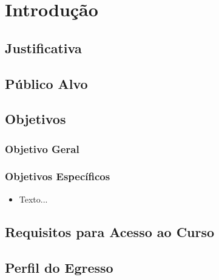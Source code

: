 \documentclass[11pt,fleqn]{book} %
\begin{document}
\chapter{Introdução}
\vspace{12em}


\section{Justificativa}


\section{Público Alvo}


\section{Objetivos}\label{objetivos}
\subsection{Objetivo Geral}


\subsection{Objetivos Específicos}
\begin{itemize}
\item Texto... 
\end{itemize}

\section{Requisitos para Acesso ao Curso}



\section{Perfil do Egresso}

\end{document}
